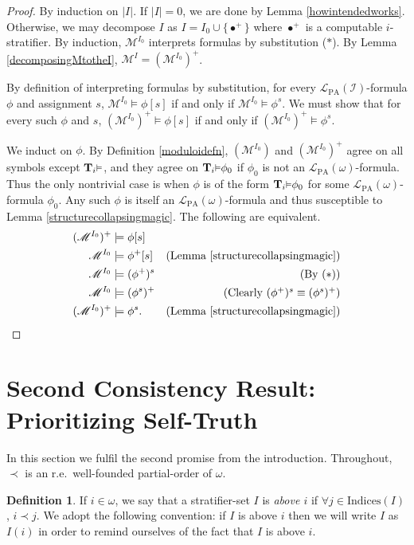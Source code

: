 \documentclass[reqno]{article}
\theoremstyle{definition}
\newtheorem{definition}[theorem]{Definition}
\def\L{\mathscr{L}}
\def\M{\mathscr{M}}
\def\T{\mathbf{T}}
\def\indices{\mathrm{Indices}}
\def\LPA{\L_{\mathrm{PA}}}
\def\indset{\mathcal I}
\renewcommand{\Pr}[1]{\T_{#1}\mbox{\small${\vDash}$}}
\begin{document}
\begin{proof}
By induction on $|I|$.
If $|I|=0$, we are done by Lemma \ref{howintendedworks}.
Otherwise, we may decompose $I$ as $I=I_0\cup\{\bullet^+\}$
where $\bullet^+$ is a computable $i$-stratifier.
By induction, $\M^{I_0}$ interprets formulas by substitution ($*$).
By Lemma \ref{decomposingMtotheI}, $\M^I=(\M^{I_0})^+$.

By definition of interpreting formulas by substitution,
for every $\LPA(\indset)$-formula $\phi$ and assignment $s$,
$\M^{I_0}\models\phi[s]$ if and only if $\M^{I_0}\models\phi^s$.
We must show that for every such $\phi$ and $s$, $(\M^{I_0})^+\models\phi[s]$ if and only
if $(\M^{I_0})^+\models\phi^s$.

We induct on $\phi$.
By Definition \ref{moduloidefn}, $(\M^{I_0})$ and $(\M^{I_0})^+$ agree on all symbols
except $\Pr i$, and they agree on $\Pr i \phi_0$ if $\phi_0$ is not an
$\LPA(\omega)$-formula.
Thus the only nontrivial case is when $\phi$
is of the form $\Pr i\phi_0$ for some $\LPA(\omega)$-formula $\phi_0$.
Any such $\phi$ is itself an $\LPA(\omega)$-formula and thus susceptible to
Lemma \ref{structurecollapsingmagic}.  The following are equivalent.
\begin{align*}
(\M^{I_0})^+ &\models \phi[s]\\
\M^{I_0} &\models \phi^+[s]
  &\mbox{(Lemma \ref{structurecollapsingmagic})}\\
\M^{I_0} &\models (\phi^+)^s
  &\mbox{(By ($*$))}\\
\M^{I_0} &\models (\phi^s)^+
  &\mbox{(Clearly $(\phi^+)^s\equiv(\phi^s)^+$)}\\
(\M^{I_0})^+ &\models \phi^s.
  &\mbox{(Lemma \ref{structurecollapsingmagic})}
\end{align*}
\end{proof}

\section[Second Consistency Result: Prioritizing Self-Truth]{Second Consistency Result:\\Prioritizing Self-Truth}

In this section
we fulfil the second promise from the introduction.
Throughout, $\prec$ is an r.e.~well-founded partial-order of $\omega$.

\begin{definition}
If $i\in\omega$, we say that a stratifier-set $I$ is \emph{above $i$}
if $\forall j\in\indices(I)$, $i\prec j$. We adopt the following convention:
if $I$ is above $i$ then we will write $I$ as $I(i)$ in order to remind
ourselves of the fact that $I$ is above $i$.
\end{definition}
\end{document}
